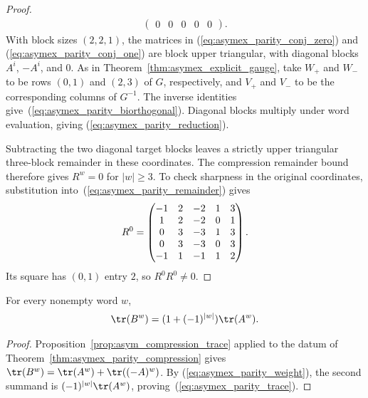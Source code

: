 \begin{proof}
\begin{align}
\begin{pmatrix}
             0 & 0 & 0  & 0  & 0
         \end{pmatrix}.
        \label{eq:asymex_parity_conj_one}
    \end{align}
    With block sizes $(2,2,1)$, the matrices in
    (\ref{eq:asymex_parity_conj_zero}) and
    (\ref{eq:asymex_parity_conj_one}) are block upper triangular,
    with diagonal blocks $A^i$, $-A^i$, and $0$.
    As in Theorem~\ref{thm:asymex_explicit_gauge}, take $W_+$ and
    $W_-$ to be rows $(0,1)$ and $(2,3)$ of $G$, respectively,
    and $V_+$ and $V_-$ to be the corresponding columns of $G^{-1}$.
    The inverse identities give~(\ref{eq:asymex_parity_biorthogonal}).
    Diagonal blocks multiply under word evaluation, giving
    (\ref{eq:asymex_parity_reduction}).

    Subtracting the two diagonal target blocks leaves a strictly
    upper triangular three-block remainder in these coordinates.
    The compression remainder bound therefore gives $R^w=0$
    for $|w|\geq3$. To check sharpness in the original coordinates,
    substitution into~(\ref{eq:asymex_parity_remainder}) gives
    \begin{align}
        R^0=\begin{pmatrix}
                -1 & 2 & -2 & 1 & 3 \\
                1  & 2 & -2 & 0 & 1 \\
                0  & 3 & -3 & 1 & 3 \\
                0  & 3 & -3 & 0 & 3 \\
                -1 & 1 & -1 & 1 & 2
            \end{pmatrix}.
        \notag
    \end{align}
    Its square has $(0,1)$ entry $2$, so $R^0R^0\neq0$.
\end{proof}

\begin{theorem}
    \label{thm:asymex_parity_trace}
    \leanok
    For every nonempty word $w$,
    \begin{align}
        \tr(B^w)=(1+(-1)^{|w|})\tr(A^w).
        \label{eq:asymex_parity_trace}
    \end{align}
\end{theorem}

\begin{proof}
    \leanok
    Proposition~\ref{prop:asym_compression_trace} applied to the datum of
    Theorem~\ref{thm:asymex_parity_compression} gives
    $\tr(B^w)=\tr(A^w)+\tr((-A)^w)$. By
    (\ref{eq:asymex_parity_weight}), the second summand is
    $(-1)^{|w|}\tr(A^w)$, proving~(\ref{eq:asymex_parity_trace}).
\end{proof}

